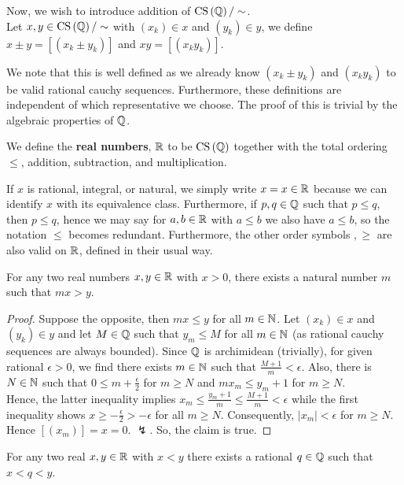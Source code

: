 \begin{definition}
	Now, we wish to introduce addition of \(\operatorname{CS}\left( \mathbb{Q} \right) / \sim\).\\
	Let \(x, y \in \operatorname{CS}\left( \mathbb{Q} \right) / \sim\) with \(\left( x_{k} \right) \in x\) and \(\left( y_{k} \right)\in y \), we define \(x \pm y = \left[ \left( x_{k} \pm y_{k} \right)  \right] \) and \(xy = \left[ \left( x_{k}y_{k} \right)  \right] \).
\end{definition}
We note that this is well defined as we already know \(\left( x_{k} \pm y_{k} \right) \) and \(\left( x_{k}y_{k} \right) \) to be valid rational cauchy sequences. Furthermore, these definitions are independent of which representative we choose. The proof of this is trivial by the algebraic properties of \(\mathbb{Q}\).
\begin{definition}
	We define the \textbf{real numbers}, \(\mathbb{R}\) to be \(\operatorname{CS} \left( \mathbb{Q} \right) \) together with the total ordering \(\leqslant\), addition, subtraction, and multiplication.
\end{definition}
\begin{convention}
	If \(x\) is rational, integral, or natural, we simply write \(x= x \in \mathbb{R}\) because we can identify \(x\) with its equivalence class. Furthermore, if \(p, q \in \mathbb{Q}\) such that \(p \le q\), then \(p \leqslant q\), hence we may say for \(a, b \in \mathbb{R}\) with \(a \leqslant b\) we also have \(a \le b\), so the notation \(\leqslant\) becomes redundant. Furthermore, the other order symbols \(<, >, \ge\) are also valid on \(\mathbb{R}\), defined in their usual way.
\end{convention}
\begin{lemma}
	For any two real numbers \(x, y \in \mathbb{R}\) with \(x > 0\), there exists a natural number \(m\) such that \(mx > y\).
\end{lemma}
\begin{proof}
	Suppose the opposite, then \(mx \le y\) for all \(m \in \mathbb{N}\). Let \(\left( x_{k} \right)\in x \) and \(\left( y_{k} \right)\in y \) and let \(M \in \mathbb{Q}\) such that \(y_{m} \le M\) for all \(m \in \mathbb{N}\) (as rational cauchy sequences are always bounded). Since \(\mathbb{Q}\) is archimidean (trivially), for given rational \(\epsilon > 0\), we find there exists \(m \in \mathbb{N}\) such that \(\frac{M+1}{m} < \epsilon\). Also, there is \(N \in \mathbb{N}\) such that \( 0 \le m + \frac{\epsilon}{2}\) for \(m \ge N\) and \(mx_{m} \le y_{m} + 1\) for \(m\ge N\).\\
	Hence, the latter inequality implies \(x_{m} \le \frac{y_{m}+1}{m} \le \frac{M+1}{m}< \epsilon\) while the first inequality shows \(x\ge - \frac{\epsilon}{2} > -\epsilon\) for all \(m \ge N\). Consequently, \(\left| x_{m} \right|< \epsilon \) for \(m \ge N\). Hence \(\left[ \left( x_{m} \right)  \right] = x = 0\). \(\lightning\). So, the claim is true.
\end{proof}
\begin{corollary}
	For any two real \(x, y \in \mathbb{R}\) with \(x<y\) there exists a rational \(q \in \mathbb{Q}\) such that \(x< q < y\).
\end{corollary}
